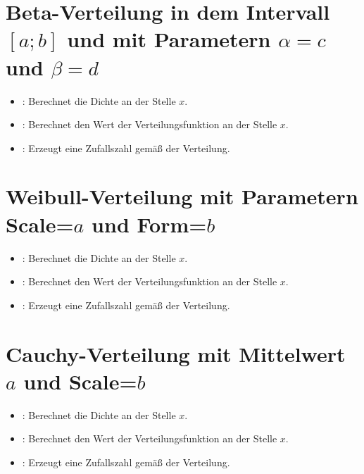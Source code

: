 \section{Beta-Verteilung in dem Intervall \texorpdfstring{$[a;b]$}{[a;b]} und mit Parametern \texorpdfstring{$\alpha=c$}{c} und \texorpdfstring{$\beta=d$}{d}}

\begin{itemize}

\item
{}:
Berechnet die Dichte an der Stelle $x$.

\item
{}:
Berechnet den Wert der Verteilungsfunktion an der Stelle $x$.

\item
{}:
Erzeugt eine Zufallszahl gemäß der Verteilung.

\end{itemize}



\section{Weibull-Verteilung mit Parametern Scale=\texorpdfstring{$a$}{a} und Form=\texorpdfstring{$b$}{b}}

\begin{itemize}

\item
{}:
Berechnet die Dichte an der Stelle $x$.

\item
{}:
Berechnet den Wert der Verteilungsfunktion an der Stelle $x$.

\item
{}:
Erzeugt eine Zufallszahl gemäß der Verteilung.

\end{itemize}



\section{Cauchy-Verteilung mit Mittelwert \texorpdfstring{$a$}{a} und Scale=\texorpdfstring{$b$}{b}}

\begin{itemize}

\item
{}:
Berechnet die Dichte an der Stelle $x$.

\item
{}:
Berechnet den Wert der Verteilungsfunktion an der Stelle $x$.

\item
{}:
Erzeugt eine Zufallszahl gemäß der Verteilung.

\end{itemize}



